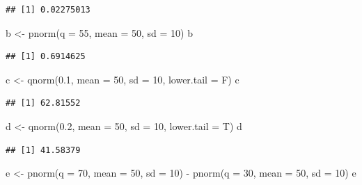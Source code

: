 \documentclass[
  11pt,
]{book}
\newenvironment{Shaded}{\begin{snugshade}}{\end{snugshade}}
\newcommand{\AttributeTok}[1]{\textcolor[rgb]{0.77,0.63,0.00}{#1}}
\newcommand{\DecValTok}[1]{\textcolor[rgb]{0.00,0.00,0.81}{#1}}
\newcommand{\FloatTok}[1]{\textcolor[rgb]{0.00,0.00,0.81}{#1}}
\newcommand{\FunctionTok}[1]{\textcolor[rgb]{0.00,0.00,0.00}{#1}}
\newcommand{\NormalTok}[1]{#1}
\newcommand{\OtherTok}[1]{\textcolor[rgb]{0.56,0.35,0.01}{#1}}
\newcommand{\SpecialCharTok}[1]{\textcolor[rgb]{0.00,0.00,0.00}{#1}}
\theoremstyle{definition}
\theoremstyle{definition}
\theoremstyle{definition}
\theoremstyle{definition}
\theoremstyle{remark}
\begin{document}
\begin{verbatim}
## [1] 0.02275013
\end{verbatim}

\begin{Shaded}
\begin{Highlighting}[]
\NormalTok{b }\OtherTok{\textless{}{-}} \FunctionTok{pnorm}\NormalTok{(}\AttributeTok{q =} \DecValTok{55}\NormalTok{, }\AttributeTok{mean =} \DecValTok{50}\NormalTok{, }\AttributeTok{sd =} \DecValTok{10}\NormalTok{)}
\NormalTok{b}
\end{Highlighting}
\end{Shaded}

\begin{verbatim}
## [1] 0.6914625
\end{verbatim}

\begin{Shaded}
\begin{Highlighting}[]
\NormalTok{c }\OtherTok{\textless{}{-}} \FunctionTok{qnorm}\NormalTok{(}\FloatTok{0.1}\NormalTok{, }\AttributeTok{mean =} \DecValTok{50}\NormalTok{, }\AttributeTok{sd =} \DecValTok{10}\NormalTok{, }\AttributeTok{lower.tail =}\NormalTok{ F)}
\NormalTok{c}
\end{Highlighting}
\end{Shaded}

\begin{verbatim}
## [1] 62.81552
\end{verbatim}

\begin{Shaded}
\begin{Highlighting}[]
\NormalTok{d }\OtherTok{\textless{}{-}} \FunctionTok{qnorm}\NormalTok{(}\FloatTok{0.2}\NormalTok{, }\AttributeTok{mean =} \DecValTok{50}\NormalTok{, }\AttributeTok{sd =} \DecValTok{10}\NormalTok{, }\AttributeTok{lower.tail =}\NormalTok{ T)}
\NormalTok{d}
\end{Highlighting}
\end{Shaded}

\begin{verbatim}
## [1] 41.58379
\end{verbatim}

\begin{Shaded}
\begin{Highlighting}[]
\NormalTok{e }\OtherTok{\textless{}{-}} \FunctionTok{pnorm}\NormalTok{(}\AttributeTok{q =} \DecValTok{70}\NormalTok{, }\AttributeTok{mean =} \DecValTok{50}\NormalTok{, }\AttributeTok{sd =} \DecValTok{10}\NormalTok{) }\SpecialCharTok{{-}} \FunctionTok{pnorm}\NormalTok{(}\AttributeTok{q =} \DecValTok{30}\NormalTok{, }\AttributeTok{mean =} \DecValTok{50}\NormalTok{, }\AttributeTok{sd =} \DecValTok{10}\NormalTok{)}
\NormalTok{e}
\end{Highlighting}
\end{Shaded}
\end{document}
